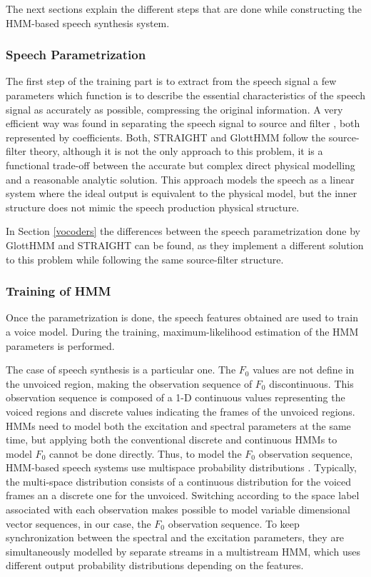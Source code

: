The next sections explain the different steps that are done while constructing the HMM-based speech synthesis system.

\subsubsection{Speech Parametrization}
\label{hmm_synthesis_parametrization}
The first step of the training part is to extract from the speech signal a few parameters which function is to describe the essential characteristics of the speech signal as accurately as possible, compressing the original information.
%
A very efficient way was found in separating the speech signal to source and filter \cite{Fant1970}, both represented by coefficients. 
%
Both, STRAIGHT and GlottHMM follow the source-filter theory, although it is not the only approach to this problem, it is a functional trade-off between the accurate but complex direct physical modelling and a reasonable analytic solution.
%
This approach models the speech as a linear system where the ideal output is equivalent to the physical model, but the inner structure does not mimic the speech production physical structure.

In Section \ref{vocoders} the differences between the speech parametrization done by GlottHMM and STRAIGHT can be found, as they implement a different solution to this problem while following the same source-filter structure.

\subsubsection{Training of HMM}
\label{hmm_synthesis_training}
Once the parametrization is done, the speech features obtained are used to train a voice model. 
%
During the training, maximum-likelihood estimation of the HMM parameters is performed.

The case of speech synthesis is a particular one.
%
The $F_{0}$ values are not define in the unvoiced region, making the observation sequence of $F_{0}$ discontinuous.
%
This observation sequence is composed of a 1-D continuous values representing the voiced regions and discrete values indicating the frames of the unvoiced regions.
%
HMMs need to model both the excitation and spectral parameters at the same time, but applying both the conventional discrete and continuous HMMs to model $F_{0}$ cannot be done directly. 
%
Thus, to model the $F_{0}$ observation sequence, HMM-based speech systems use multispace probability distributions \cite{tokuda2002multi}. 
%
Typically, the multi-space distribution consists of a continuous distribution for the voiced frames an a discrete one for the unvoiced. 
%
Switching according to the space label associated with each observation makes possible to model variable dimensional vector sequences, in our case, the $F_{0}$ observation sequence.
% 
To keep synchronization between the spectral and the excitation parameters, they are simultaneously modelled by separate streams in a multistream HMM, which uses different output probability distributions depending on the features.

